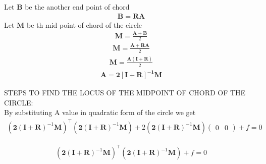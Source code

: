 \documentclass[10pt, a4paper]{article}
\newcommand{\myvec}[1]{\ensuremath{\begin{pmatrix}#1\end{pmatrix}}}
\let\vec\mathbf
\begin{document}
Let $\vec{B}$ be the another end point of chord \\\vspace{1mm}
\begin{align}
    \vec{B} =\vec{R}\vec{A}
\end{align}
Let $\vec{M}$ be th mid point of chord of the circle
\begin{align}
    \vec{M} = \frac{\vec{A}+\vec{B}}{2}
\end{align}
\begin{align}
     \vec{M} = \frac{\vec{A}+\vec{R}\vec{A}}{2}
\end{align}
\begin{align}
     \vec{M} = \frac{\vec{A(I+R)}}{2}
\end{align}
\begin{align}
     \vec{A} =\vec{2[I+R]^{-1}M}
\end{align}

STEPS TO FIND THE LOCUS OF THE MIDPOINT OF CHORD OF THE CIRCLE:\\
By substituting A value in quadratic form of the circle we get
\begin{align}
(\vec{2(I+R)}^{-1}\vec{M})^{\top}(\vec{2(I+R)}^{-1}\vec{M})+2(\vec{2(I+R)}^{-1}\vec{M})\myvec{0 & 0}+f=0
\end{align}

\begin{align}
(\vec{2(I+R)}^{-1}\vec{M})^{\top}(\vec{2(I+R)}^{-1}\vec{M})+f=0
\end{align}
\end{document}
